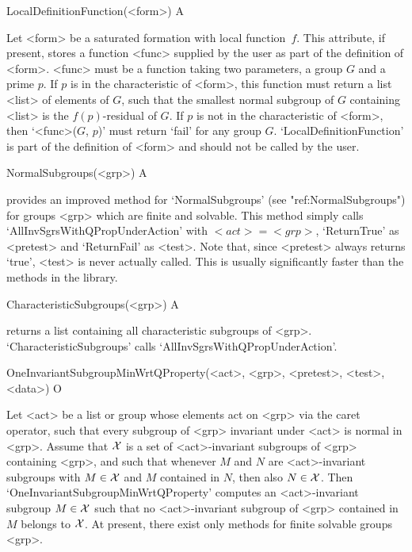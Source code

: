 \>LocalDefinitionFunction(<form>) A

Let <form> be a saturated formation with local function~$f$. This attribute,
if present, stores a function <func> supplied by the user as part of the
definition of <form>. <func> must be a function taking two parameters, a group
$G$ and a prime $p$. If $p$ is in the characteristic of <form>, this
function must return a list <list> of elements of
$G$, such that the smallest normal subgroup of $G$ containing <list> is the
$f(p)$-residual of $G$. If $p$ is not in the characteristic of <form>, 
then `<func>($G$, $p$)' must return `fail' for any group $G$.
`LocalDefinitionFunction' is part of the definition of <form> and should not
be called by the user. 


\null

\>NormalSubgroups(<grp>) A

{\CRISP} provides an improved method for `NormalSubgroups' (see
"ref:NormalSubgroups") for groups <grp> which are finite and  solvable.
This method simply calls `AllInvSgrsWithQPropUnderAction' with
$<act> = <grp>$, `ReturnTrue'
as <pretest> and `ReturnFail' as <test>. Note that, since
<pretest> always returns `true', <test> is never actually called.
This is usually significantly faster than the methods in the {\GAP} library.

\>CharacteristicSubgroups(<grp>) A

returns a list containing all characteristic subgroups of <grp>. 
`CharacteristicSubgroups' calls `AllInvSgrsWithQPropUnderAction'.

\null


\>OneInvariantSubgroupMinWrtQProperty(<act>, <grp>, <pretest>, <test>, <data>) O

Let <act> be a list or group whose elements act on <grp> via the caret operator,
such that every subgroup of <grp> invariant under <act> is normal in <grp>. 
Assume that $\cal X$ is a set of <act>-invariant subgroups of <grp> containing <grp>, and
such that whenever
$M$ and $N$ are <act>-invariant subgroups with $M \in \cal X$ and $M$
contained in $N$, then also $N \in \cal X$. Then
`OneInvariantSubgroupMinWrtQProperty' computes an <act>-invariant subgroup $M \in \cal X$
such that no <act>-invariant subgroup of <grp> contained in $M$ belongs to $\cal X$. 
At present, there exist only methods for finite solvable groups <grp>.

